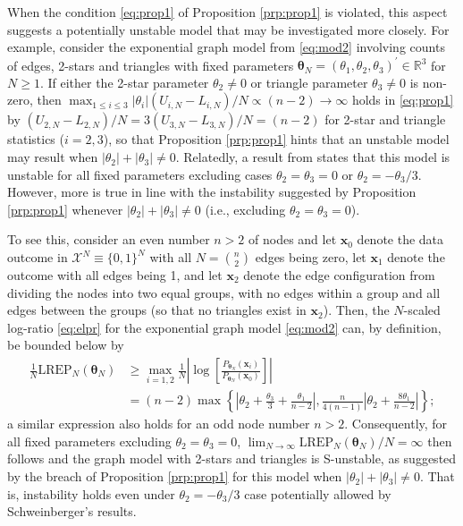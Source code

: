 \documentclass[numbib]{imamat}
\theoremstyle{theorem}
\theoremstyle{lemma}
\theoremstyle{example}
\theoremstyle{corollary}
\theoremstyle{definition}
\theoremstyle{remark}
\theoremstyle{approximation}
\theoremstyle{scheme}
\newcommand{\REP}{\mathrm{LREP}}
\begin{document}
When the condition \eqref{eq:prop1} of Proposition \ref{prp:prop1} is
violated, this aspect suggests a potentially unstable model that may be
investigated more closely. For example, consider the exponential graph
model from \eqref{eq:mod2} involving counts of edges, 2-stars and
triangles with fixed parameters
\(\boldsymbol \theta_N = (\theta_{1},\theta_2,\theta_3)^\prime \in \mathbb{R}^3\)
for \(N\geq 1\). If either the 2-star parameter \(\theta_2 \neq 0\) or
triangle parameter \(\theta_3 \neq 0\) is non-zero, then
\(\max_{1 \leq i \leq 3 } |\theta_{i}|(U_{i,N}-L_{i,N})/N \propto (n-2)\to \infty\)
holds in \eqref{eq:prop1} by
\((U_{2,N}-L_{2,N})/N = 3 (U_{3,N}-L_{3,N})/N=(n-2)\) for 2-star and
triangle statistics (\(i=2,3\)), so that Proposition \ref{prp:prop1}
hints that an unstable model may result when
\(|\theta_2| + |\theta_3| \neq 0\). Relatedly, a result from
\citet[Result 3]{schweinberger2011instability} states that this model is
unstable for all fixed parameters excluding cases
\(\theta_2 =\theta_3=0\) or \(\theta_2 = - \theta_3/3\). However, more
is true in line with the instability suggested by Proposition
\ref{prp:prop1} whenever \(|\theta_2| + |\theta_3| \neq 0\) (i.e.,
excluding \(\theta_2 =\theta_3=0\)).

To see this, consider an even number \(n>2\) of nodes and let
\(\boldsymbol x_0\) denote the data outcome in
\(\mathcal{X}^N \equiv \{0,1\}^N\) with all \(N = {n \choose 2}\) edges
being zero, let \(\boldsymbol x_1\) denote the outcome with all edges
being 1, and let \(\boldsymbol x_2\) denote the edge configuration from
dividing the nodes into two equal groups, with no edges within a group
and all edges between the groups (so that no triangles exist in
\(\boldsymbol x_2\)). Then, the \(N\)-scaled log-ratio \eqref{eq:elpr} for
the exponential graph model \eqref{eq:mod2} can, by definition, be bounded
below by \begin{align*}
\frac{1}{N}\REP_N(\boldsymbol \theta_N) &\geq \max_{i=1,2}\frac{1}{N}
\left| \log\left[ \frac{P_{\boldsymbol \theta_N}(\boldsymbol x_i)}{P_{\boldsymbol \theta_N}(\boldsymbol x_0)}\right] \right| \\
&= (n-2) \max\left\{ \left| \theta_2 + \frac{\theta_3}{3}+\frac{\theta_1}{n-2} \right|, \frac{n}{4(n-1)} \left| \theta_2 + \frac{8\theta_1}{n-2} \right| \right\};
\end{align*} a similar expression also holds for an odd node number
\(n>2\). Consequently, for all fixed parameters excluding
\(\theta_2=\theta_3=0\),
\(\lim_{N\to \infty}\REP_N(\boldsymbol \theta_N)/N=\infty\) then follows
and the graph model with 2-stars and triangles is S-unstable, as
suggested by the breach of Proposition \ref{prp:prop1} for this model
when \(|\theta_2|+|\theta_3|\neq 0\). That is, instability holds even
under \(\theta_2 = - \theta_3/3\) case potentially allowed by
Schweinberger's \citeyearpar{schweinberger2011instability} results.
\end{document}
